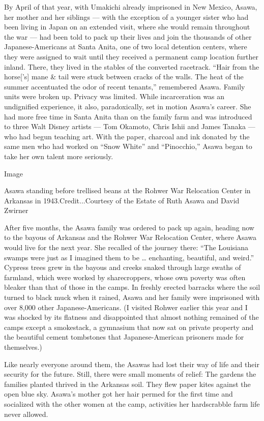 By April of that year, with Umakichi already imprisoned in New Mexico,
Asawa, her mother and her siblings --- with the exception of a younger
sister who had been living in Japan on an extended visit, where she
would remain throughout the war --- had been told to pack up their lives
and join the thousands of other Japanese-Americans at Santa Anita, one
of two local detention centers, where they were assigned to wait until
they received a permanent camp location further inland. There, they
lived in the stables of the converted racetrack. ``Hair from the
horse{[}'s{]} mane \& tail were stuck between cracks of the walls. The
heat of the summer accentuated the odor of recent tenants,'' remembered
Asawa. Family units were broken up. Privacy was limited. While
incarceration was an undignified experience, it also, paradoxically, set
in motion Asawa's career. She had more free time in Santa Anita than on
the family farm and was introduced to three Walt Disney artists --- Tom
Okamoto, Chris Ishii and James Tanaka --- who had begun teaching art.
With the paper, charcoal and ink donated by the same men who had worked
on ``Snow White'' and ``Pinocchio,'' Asawa began to take her own talent
more seriously.

Image

Asawa standing before trellised beans at the Rohwer War Relocation
Center in Arkansas in 1943.Credit...Courtesy of the Estate of Ruth Asawa
and David Zwirner

After five months, the Asawa family was ordered to pack up again,
heading now to the bayous of Arkansas and the Rohwer War Relocation
Center, where Asawa would live for the next year. She recalled of the
journey there: ``The Louisiana swamps were just as I imagined them to be
\ldots{} enchanting, beautiful, and weird.'' Cypress trees grew in the
bayous and creeks snaked through large swaths of farmland, which were
worked by sharecroppers, whose own poverty was often bleaker than that
of those in the camps. In freshly erected barracks where the soil turned
to black muck when it rained, Asawa and her family were imprisoned with
over 8,000 other Japanese-Americans. (I visited Rohwer earlier this year
and I was shocked by its flatness and disappointed that almost nothing
remained of the camps except a smokestack, a gymnasium that now sat on
private property and the beautiful cement tombstones that
Japanese-American prisoners made for themselves.)

Like nearly everyone around them, the Asawas had lost their way of life
and their security for the future. Still, there were small moments of
relief: The gardens the families planted thrived in the Arkansas soil.
They flew paper kites against the open blue sky. Asawa's mother got her
hair permed for the first time and socialized with the other women at
the camp, activities her hardscrabble farm life never allowed.

